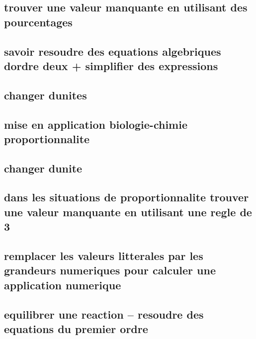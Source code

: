 \documentclass[11pt]{article}
\begin{document}
    \subsection{trouver une valeur manquante en utilisant des pourcentages}
      
    \subsection{savoir resoudre des equations algebriques dordre deux + simplifier des expressions}
      
    \subsection{changer dunites}
      
      
    \subsection{mise en application   biologie-chimie proportionnalite}
      
    \subsection{changer dunite}
      
    \subsection{dans les situations de proportionnalite  trouver une valeur manquante en utilisant une regle de 3}
      
      
    \subsection{remplacer les valeurs litterales par les grandeurs numeriques pour calculer une application numerique}
      
    \subsection{equilibrer une reaction -- resoudre des equations du premier ordre}
      
\end{document}

